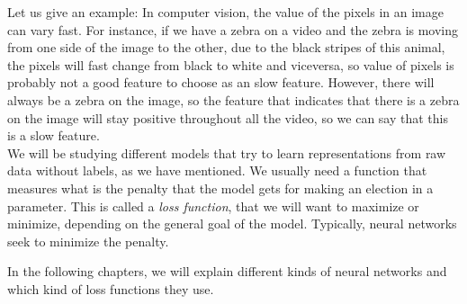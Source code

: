Let us give an example: In computer vision, the value of the pixels in an image can vary fast. For instance, if we have a zebra on a video and the zebra is moving from one side of the image to the other, due 
to the black stripes of this animal, the pixels will fast change from black to white and viceversa, so value of pixels is probably not a good feature to choose as an slow feature. However, there will always
be a zebra on the image, so the feature that indicates that there is a zebra on the image will stay positive throughout all the video, so we can say that this is a slow feature.\\

We will be studying different models that try to learn representations from raw data without labels, as we have mentioned. We usually need a function that measures what is the penalty that the model gets for making an election in a parameter.
This is called a \emph{loss function}, that we will want to maximize or minimize, depending on the general goal of the model. Typically, neural networks seek to minimize the penalty.

In the following chapters, we will explain different kinds of neural networks and which kind of loss functions they use. 


